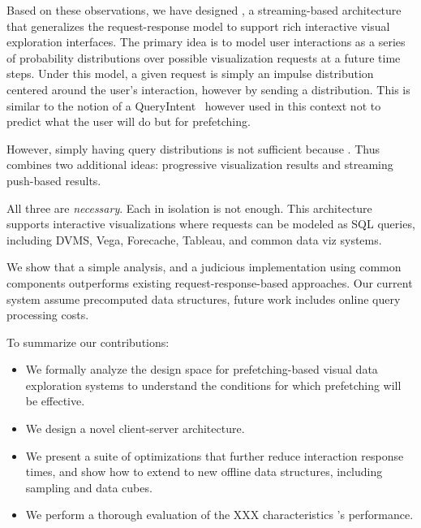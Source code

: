 Based on these observations, we have designed \sys, a streaming-based architecture that generalizes the request-response model to support rich interactive visual exploration interfaces.  The primary idea is to model user interactions as a series of probability distributions over possible visualization requests at a future time steps.  Under this model, a given request is simply an impulse distribution centered around the user's interaction, however by sending a distribution.  This is similar to the notion of a QueryIntent~\cite{ebenstein2016fluxquery} however used in this context not to predict what the user will do but for prefetching.

However, simply having query distributions is not sufficient because .  Thus \sys combines two additional ideas: progressive visualization results and streaming push-based results. 

All three are {\it necessary}.  Each in isolation is not enough.   This architecture supports interactive visualizations where requests can be modeled as SQL queries, including DVMS, Vega, Forecache, Tableau, and common data viz systems.


We show that a simple analysis, and a judicious implementation using common components outperforms existing request-response-based approaches.
Our current system assume precomputed data structures, future work includes online query processing costs.


To summarize our contributions:

\begin{itemize}[leftmargin=*, topsep=0mm, itemsep=0mm]

\item We formally analyze the design space for prefetching-based visual data exploration systems to understand the conditions for which prefetching will be effective.

\item We design a novel client-server architecture.

\item We present a suite of optimizations that further reduce interaction response times, and show how to extend to new offline data structures, including sampling and data cubes.

\item We perform a thorough evaluation of the XXX characteristics \sys's performance.  

\end{itemize}
